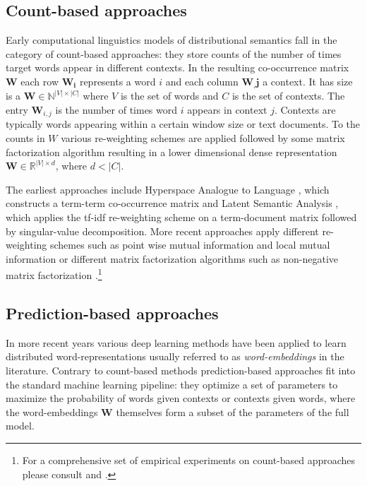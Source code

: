 \subsection{Count-based approaches}
\label{sec:count}

Early computational linguistics models of distributional semantics fall in the category of
count-based approaches: they store counts of the number of times target words appear in different
contexts. In the  resulting co-occurrence matrix
$\mathbf{W}$ each row $\mathbf{W_i}$ represents a
word $i$ and each column $\mathbf{W_,j}$ a context. It has size
is a $\mathbf{W} \in \mathbb{N}^{|V| \times |C|}$ where $V$ is the set of words and $C$ is
the set of contexts.
The entry $\mathbf{W}_{i,j}$ is the number of times word $i$ appears in context $j$.
Contexts are typically words appearing within a certain window size or text documents.
To the counts in $W$ various re-weighting schemes are applied followed by some matrix factorization algorithm
resulting in a lower dimensional dense representation $\mathbf{W} \in \mathbb{R}^{|V| \times d}$,
where $d < |C|$.

The earliest approaches include Hyperspace Analogue to Language \citep{lund1996producing},
which constructs a term-term co-occurrence matrix and Latent Semantic Analysis \citep{dumais2004latent},
which applies the tf-idf re-weighting scheme on a term-document matrix
followed by singular-value decomposition.
More recent approaches apply different re-weighting schemes such as
point wise mutual information \cite{bullinaria2007extracting}  and local mutual
information \citep{evert2005statistics} or different matrix factorization algorithms such as non-negative
matrix factorization \citep{baroni2014don}.\footnote{For a comprehensive set of empirical experiments on count-based
approaches please consult \cite{bullinaria2007extracting} and \cite{bullinaria2012extracting}.}
\subsection{Prediction-based approaches}
\label{sec:pred}
In more recent years
various deep learning methods have been applied to learn distributed word-representations usually referred to
as \emph{word-embeddings} in the literature.
Contrary to count-based methods prediction-based approaches fit into the
standard machine learning pipeline: they optimize a set of parameters to maximize the probability of words
given contexts or contexts given words, where the word-embeddings $\mathbf{W}$
themselves form a subset of the parameters of the full model.

